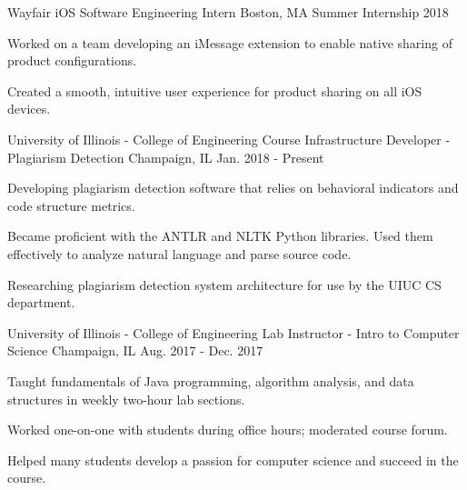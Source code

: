 
\begin{cventries}
\cventry
{Wayfair} %
{iOS Software Engineering Intern} %
{Boston, MA} %
{Summer Internship 2018} %
{
	\begin{cvitems} %
		\item {Worked on a team developing an iMessage extension to enable native sharing of product configurations.}
		\item {Created a smooth, intuitive user experience for product sharing on all iOS devices.}
	\end{cvitems}
}
\cventry
{University of Illinois - College of Engineering} %
{Course Infrastructure Developer - Plagiarism Detection} %
{Champaign, IL} %
{Jan. 2018 - Present} %
{
    \begin{cvitems} %
        \item {Developing plagiarism detection software that relies on behavioral indicators and code structure metrics.}
        \item {Became proficient with the ANTLR and NLTK Python libraries. Used them effectively to analyze natural language and parse source code.}
       \item {Researching plagiarism detection system architecture for use by the UIUC CS department.}
    \end{cvitems}
}
\cventry
{University of Illinois - College of Engineering} %
{\newline Lab Instructor - Intro to Computer Science} %
{Champaign, IL} %
{Aug. 2017 - Dec. 2017} %
{
	\begin{cvitems} %
		\item {Taught fundamentals of Java programming, algorithm analysis, and data structures in weekly two-hour lab sections.}
		\item {Worked one-on-one with students during office hours; moderated course forum.}
		\item {Helped many students develop a passion for computer science and succeed in the course.}
	\end{cvitems}
}
\end{cventries}
